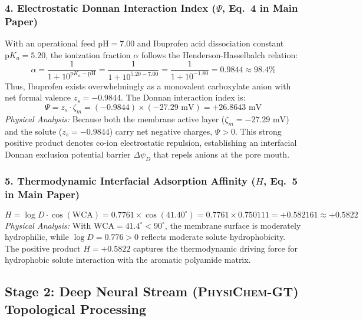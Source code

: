\documentclass[11pt]{article}
\begin{document}
\subsubsection{4. Electrostatic Donnan Interaction Index ($\Psi$, Eq.~4 in Main Paper)}
With an operational feed $\mathrm{pH} = 7.00$ and Ibuprofen acid dissociation constant $\mathrm{p}K_a = 5.20$, the ionization fraction $\alpha$ follows the Henderson-Hasselbalch relation:
\begin{equation}
\alpha = \frac{1}{1 + 10^{\mathrm{p}K_a - \mathrm{pH}}} = \frac{1}{1 + 10^{5.20 - 7.00}} = \frac{1}{1 + 10^{-1.80}} = 0.9844 \approx 98.4\%
\end{equation}
Thus, Ibuprofen exists overwhelmingly as a monovalent carboxylate anion with net formal valence $z_s = -0.9844$. The Donnan interaction index is:
\begin{equation}
\Psi = z_s \cdot \zeta_m = (-0.9844) \times (-27.29\text{ mV}) = +26.8643\text{ mV}
\end{equation}
\noindent\textit{Physical Analysis:} Because both the membrane active layer ($\zeta_m = -27.29\text{ mV}$) and the solute ($z_s = -0.9844$) carry net negative charges, $\Psi > 0$. This strong positive product denotes co-ion electrostatic repulsion, establishing an interfacial Donnan exclusion potential barrier $\Delta\psi_D$ that repels anions at the pore mouth.

\subsubsection{5. Thermodynamic Interfacial Adsorption Affinity ($H$, Eq.~5 in Main Paper)}
\begin{equation}
H = \log D \cdot \cos(\mathrm{WCA}) = 0.7761 \times \cos(41.40^\circ) = 0.7761 \times 0.750111 = +0.582161 \approx +0.5822
\end{equation}
\noindent\textit{Physical Analysis:} With $\mathrm{WCA} = 41.4^\circ < 90^\circ$, the membrane surface is moderately hydrophilic, while $\log D = 0.776 > 0$ reflects moderate solute hydrophobicity. The positive product $H = +0.5822$ captures the thermodynamic driving force for hydrophobic solute interaction with the aromatic polyamide matrix.

\subsection{Stage 2: Deep Neural Stream (\textsc{PhysiChem-GT}) Topological Processing}
\label{sec:walkthrough_gt}
\end{document}
